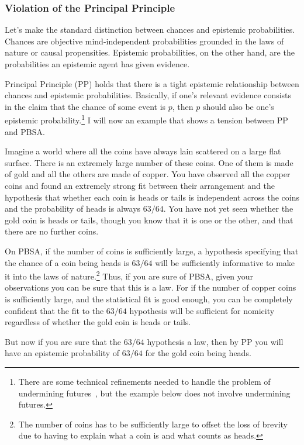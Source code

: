 \subsubsection{Violation of the Principal Principle}\label{sec:principal-principle}
Let's make the standard distinction between chances and epistemic probabilities. Chances are objective mind-independent probabilities 
grounded in the laws of nature or causal propensities. Epistemic probabilities, on the other hand, are the probabilities an epistemic agent 
has given evidence. 

 Principal Principle (PP) holds that there is a tight epistemic relationship between chances and epistemic 
probabilities. Basically, if one's relevant evidence consists in the claim that the chance of some event is $p$, then $p$ should
also be one's epistemic probability.\footnote{There are some technical refinements needed to handle the problem of
undermining futures~\cite{HallUndermining,LewisUndermining,ThauUndermining}, but the example below does not involve undermining futures.} 
I will now an example that shows a tension between PP and PBSA.

Imagine a world where all the coins have always lain scattered on a large flat surface. There is an 
extremely large number of these coins. One of them is made of gold and all the others are made of copper. You have observed
all the copper coins and found an extremely strong fit between their arrangement and the hypothesis that whether each coin 
is heads or tails is independent across the coins and the probability of heads is always $63/64$. You have not yet seen whether
the gold coin is heads or tails, though you know that it is one or the other, and that there are no further coins.

On PBSA, if the number of coins is sufficiently large, a hypothesis specifying that the chance of a coin being heads is $63/64$ will 
be sufficiently informative to make it into the laws of nature.\footnote{The number of coins has to be sufficiently large to 
offset the loss of brevity due to having to explain what a coin is and what counts as heads.} Thus, if you are sure of PBSA,
given your observations you can be sure that this is a law. For if the number of copper coins is sufficiently large, and the
statistical fit is good enough, you can be completely confident that the fit to the $63/64$ hypothesis will be sufficient for nomicity regardless of whether the gold coin is heads or tails. 

But now if you are sure that the $63/64$ hypothesis a law, then by PP you will have an epistemic probability of $63/64$ for the gold coin being heads. 

